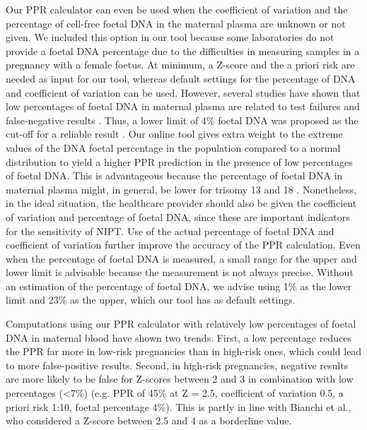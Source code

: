 Our PPR calculator can even be used when the coefficient of variation and the percentage of cell-free foetal DNA in the maternal plasma are unknown or not given. 
We included this option in our tool because some laboratories do not provide a foetal DNA percentage due to the difficulties in measuring samples in a pregnancy with a female foetus. 
At minimum, a Z-score and the a priori risk are needed as input for our tool, whereas default settings for the percentage of DNA and coefficient of variation can be used. 
However, several studies have shown that low percentages of foetal DNA in maternal plasma are related to test failures and false-negative results \cite{Canick_2012,Bianchi_2013}. 
Thus, a lower limit of 4\% foetal DNA was proposed as the cut-off for a reliable result \cite{Fairbrother_2013,Norton_2012}. 
Our online tool gives extra weight to the extreme values of the DNA foetal percentage in the population compared to a normal distribution to yield a higher PPR prediction in the presence of low percentages of foetal DNA. 
This is advantageous because the percentage of foetal DNA in maternal plasma might, in general, be lower for trisomy 13 and 18 \cite{Fairbrother_2013,Hall_2014,Wegrzyn_2005,Palomaki_2015}. 
Nonetheless, in the ideal situation, the healthcare provider should also be given the coefficient of variation and percentage of foetal DNA, since these are important indicators for the sensitivity of NIPT.
Use of the actual percentage of foetal DNA and coefficient of variation further improve the accuracy of the PPR calculation. 
Even when the percentage of foetal DNA is measured, a small range for the upper and lower limit is advisable because the measurement is not always precise. Without an estimation of the percentage of foetal DNA, we advise using 1\% as the lower limit and 23\% as the upper, which our tool has as default settings.

Computations using our PPR calculator with relatively low percentages of foetal DNA in maternal blood have shown two trends. 
First, a low percentage reduces the PPR far more in low-risk pregnancies than in high-risk ones, which could lead to more false-positive results. Second, in high-risk pregnancies, negative results are more likely to be false for Z-scores between 2 and 3 in combination with low percentages (\textless7\%) (e.g. PPR of 45\% at Z = 2.5, coefficient of variation 0.5, a priori risk 1:10, foetal percentage 4\%). 
This is partly in line with Bianchi et al.\cite{Bianchi_2012}, who considered a Z-score between 2.5 and 4 as a borderline value.

